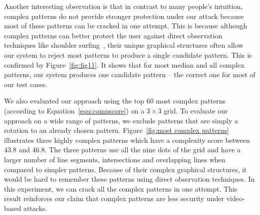         Another interesting observation is that in contrast to many people's
        intuition, complex patterns do not provide stronger protection under our attack because
        most of these patterns can be cracked in one attempt.
        This is because although complex patterns can better protect the user against direct observation techniques like shoulder surfing~\cite{shoulder}, their unique graphical structures
        often allow our system to reject most patterns to produce a single candidate pattern. This is
        confirmed by Figure~\ref{fig:fig11}. It shows that for most median and all complex patterns, our system produces one candidate pattern --
        the correct one for most of our test cases.


       We also evaluated our approach using the top 60 most complex
        patterns (according to Equation~\ref {equ:compscore}) on a $3 \times 3$
        grid.
        To evaluate our approach on a wide range of patterns, we exclude patterns that are simply a rotation to an already chosen pattern.
         Figure~\ref {fig:most complex patterns} illustrates three
        highly complex patterns which have a complexity score between 43.8 and 46.8. The three
        patterns use all the nine dots of the grid and have a larger number of line segments, intersections and overlapping lines when compared to simpler patterns.
        Because of their complex graphical structures, it would be hard to remember
        these patterns using direct observation techniques.
        In this experiment, we can crack all the complex patterns in one attempt. This result reinforces our claim that complex
        patterns are less security under video-based attacks.




